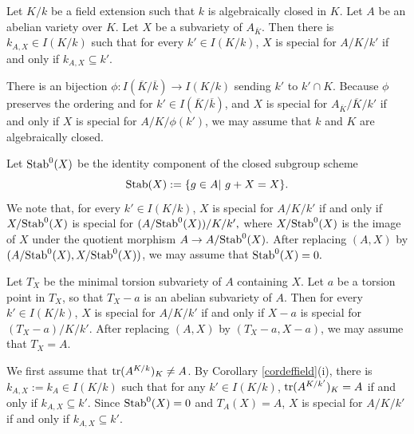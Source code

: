 



\begin{pro}\label{lemnonspecial}
Let $K/k$ be a field extension such that $k$ is algebraically closed in $K$.
Let $A$ be an abelian variety over $K$.  Let $X$ be a subvariety of $A_{\overline{K}}.$
Then there is $k_{A,X}\in I(K/k)$ such that for every $k'\in I(K/k)$, $X$ is special  for $A/K/k'$  if and only if $k_{A,X}\subseteq k'$.
\end{pro}

\proof
There is an bijection $\phi: I(\overline{K}/\overline{k})\to I(K/k)$ sending $k'$ to $k'\cap K.$ Because $\phi$ preserves the ordering and for $k'\in I(\overline{K}/\overline{k})$, and
$X$ is special  for $A_{\overline{K}}/\overline{K}/k'$ if and only if $X$ is special  for $A/K/\phi(k')$, we may assume that $k$ and $K$ are algebraically closed.






Let ${\mathrm{Stab}}^0(X)$ be the identity component of the closed subgroup scheme
$${\mathrm{Stab}}(X):=\{g\in A|\,\, g+X=X\}.$$
We note that, for every $k'\in I(K/k)$,  $X$ is special  for $A/K/k'$ if and only if $X/{\mathrm{Stab}}^0(X)$ is special  for $(A/{\mathrm{Stab}}^0(X))/K/k',$
where  $X/{\mathrm{Stab}}^0(X)$ is the image of $X$ under the quotient morphism $A\to A/{\mathrm{Stab}}^0(X).$
After replacing $(A, X)$ by $(A/{\mathrm{Stab}}^0(X), X/{\mathrm{Stab}}^0(X))$, we may assume that ${\mathrm{Stab}}^0(X)=0.$


Let $T_X$ be the minimal torsion subvariety of $A$ containing $X.$ Let $a$ be a torsion point in $T_X$, so that $T_X-a$ is an abelian subvariety of $A$.
Then for every $k'\in I(K/k)$,  $X$ is special  for $A/K/k'$ if and only if $X-a$ is special  for $(T_X-a)/K/k'.$ After replacing $(A,X)$ by $(T_X-a, X-a)$, we may assume that $T_X=A.$



We first assume that ${\rm tr}(A^{K/k})_K\neq A$.
By Corollary \ref{cordeffield}(i), there is $k_{A,X}:=k_A\in I(K/k)$ such that for any $k'\in I(K/k)$,
${\rm tr}(A^{K/k'})_K= A$ if and only if $k_{A,X}\subseteq k'.$
Since ${\mathrm{Stab}}^0(X)=0$ and $T_A(X)=A$, $X$ is special for $A/K/k'$ if and only if $k_{A,X}\subseteq k'.$



